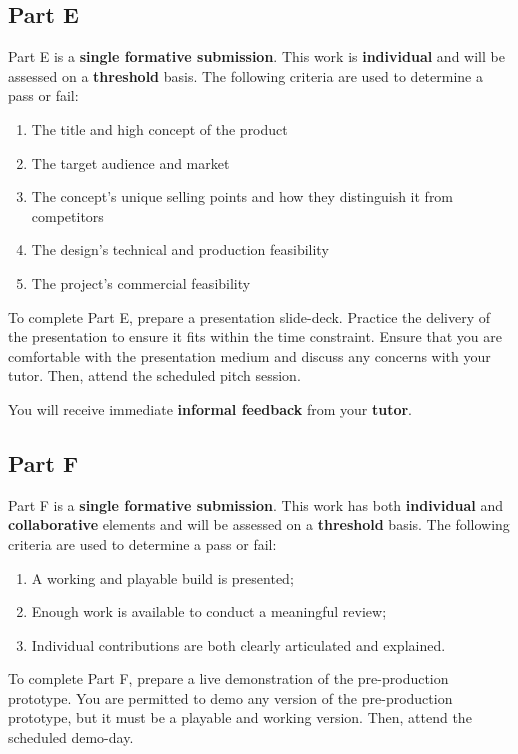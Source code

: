 \documentclass{../../fal_assignment}
\begin{document}
\subsection*{Part E}

Part E is a \textbf{single formative submission}. This work is \textbf{individual} and will be assessed on a \textbf{threshold} basis. The following criteria are used to determine a pass or fail:

\begin{enumerate}[label=(\alph*)]
	\item The title and high concept of the product
	\item The target audience and market
	\item The concept's unique selling points and how they distinguish it from competitors
	\item The design's technical and production feasibility
	\item The project's commercial feasibility
\end{enumerate}

To complete Part E, prepare a presentation slide-deck. Practice the delivery of the presentation to ensure it fits within the time constraint. Ensure that you are comfortable with the presentation medium and discuss any concerns with your tutor. Then, attend the scheduled pitch session.

You will receive immediate \textbf{informal feedback} from your \textbf{tutor}.

\subsection*{Part F}

Part F is a \textbf{single formative submission}. This work has both \textbf{individual} and \textbf{collaborative} elements and will be assessed on a \textbf{threshold} basis. The following criteria are used to determine a pass or fail:

\begin{enumerate}[label=(\alph*)]
	\item A working and playable build is presented;
	\item Enough work is available to conduct a meaningful review;
	\item Individual contributions are both clearly articulated and explained.
\end{enumerate}

To complete Part F, prepare a live demonstration of the pre-production prototype. You are permitted to demo any version of the pre-production prototype, but it must be a playable and working version. Then, attend the scheduled demo-day.
\end{document}
